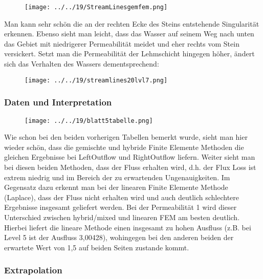 \begin{figure}[H]
	\centering
	
	\texttt{[image: ../../19/StreamLinesgemfem.png]}
	
\end{figure}
Man kann sehr schön die an der rechten Ecke des Steins entstehende Singularität erkennen. Ebenso sieht man leicht, dass das Wasser auf seinem Weg nach unten das Gebiet mit niedrigerer Permeabilität meidet und eher rechts vom Stein versickert. 
Setzt man die Permeabilität der Lehmschicht hingegen höher,
ändert sich das Verhalten des Wassers dementsprechend:
\begin{figure}[H]
	\centering
	
	\texttt{[image: ../../19/streamlines20lvl7.png]}
	
\end{figure}

\newpage
\subsubsection{Daten und Interpretation}
\begin{figure}[H]
	\centering
		\texttt{[image: ../../19/blatt5tabelle.png]} 
\end{figure}
Wie schon bei den beiden vorherigen Tabellen bemerkt wurde, sieht man hier wieder schön, dass die gemischte und hybride Finite Elemente Methoden die gleichen Ergebnisse bei LeftOutflow und RightOutflow liefern. \newline
Weiter sieht man bei diesen beiden Methoden, dass der Fluss erhalten wird, d.h. der Flux Loss ist extrem niedrig und im Bereich der zu erwartenden Ungenauigkeiten. \newline Im Gegensatz dazu erkennt man bei der linearen Finite Elemente Methode (Laplace), dass der Fluss nicht erhalten wird und auch deutlich schlechtere Ergebnisse insgesamt geliefert werden. \newline
Bei der Permeabilität 1 wird dieser Unterschied zwischen hybrid/mixed und linearen FEM am besten deutlich. Hierbei liefert die lineare Methode einen insgesamt zu hohen Ausfluss (z.B. bei Level 5 ist der Ausfluss 3,00428), wohingegen bei den anderen beiden der erwartete Wert von 1,5 auf beiden Seiten zustande kommt. 

\subsubsection{Extrapolation}

